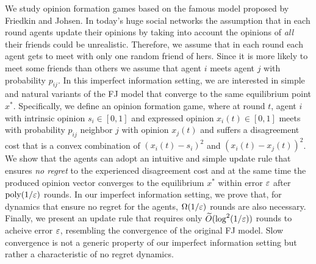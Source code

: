 We study opinion formation games based on the famous model proposed by Friedkin
and Johsen.  In today's huge social networks the assumption that in each round
agents update their opinions by taking into account the opinions of \emph{all}
their friends could be unrealistic. Therefore, we assume that in each round
each agent gets to meet with only one random friend of hers. Since it is more
likely to meet some friends than others we assume that agent $i$ meets agent
$j$ with probability $p_{ij}$.  In this imperfect information setting, we are
interested in simple and natural variants of the FJ model that converge to the
same equilibrium point $x^*$.  Specifically, we define an opinion formation
game, where at round $t$, agent $i$ with intrinsic opinion $s_i\in[0,1]$ and
expressed opinion $x_i(t) \in[0,1]$ meets with probability $p_{ij}$ neighbor
$j$ with opinion $x_j(t)$ and suffers a disagreement cost that is a convex
combination of $(x_i(t) - s_i)^2$ and $(x_i(t) - x_j(t))^2$.  We show that the
agents can adopt an intuitive and simple update rule that ensures
\emph{no regret} to the experienced disagreement cost and at the same time the
produced opinion vector converges to the equilibrium $x^*$ within error $\varepsilon$
after $\mathrm{poly}(1/\varepsilon)$ rounds.  In our imperfect information setting, we
prove that, for dynamics that ensure no regret for the agents,
$\Omega(1/\varepsilon)$ rounds are also necessary.  Finally, we present an update rule that
requires only $\widetilde{O}(\log^2(1/\varepsilon))$ rounds to acheive error $\varepsilon$,
resembling the convergence of the original FJ model.  Slow convergence is not
a generic property of our imperfect information setting but rather a
characteristic of no regret dynamics.
